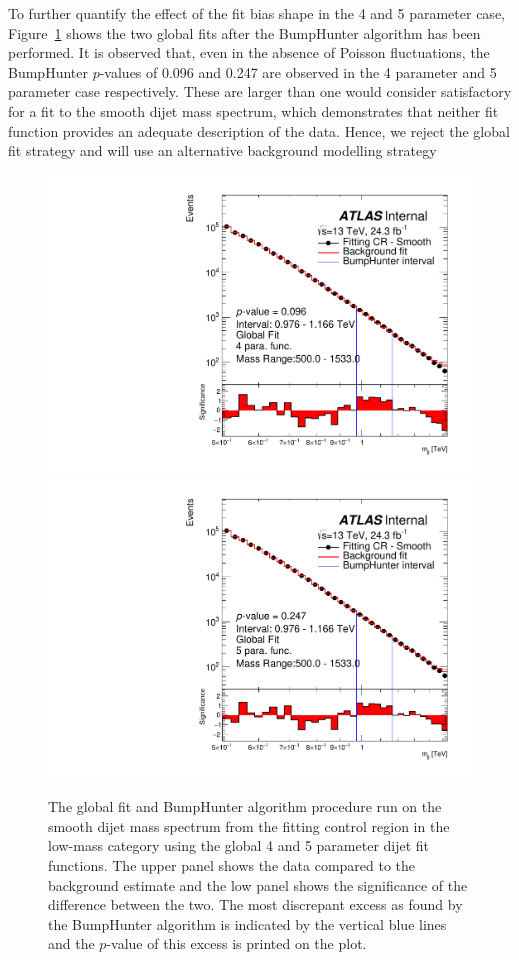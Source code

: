 To further quantify the effect of the fit bias shape in the 4 and 5 parameter case,
Figure~\ref{fig:bhFit_lm_global} shows the two global fits after the {\sc BumpHunter} algorithm has been performed.
It is observed that, even in the absence of Poisson fluctuations,
the {\sc BumpHunter} \mbox{$p$-value}s of 0.096 and 0.247 are observed in the 4 parameter and 5 parameter case respectively.
These are larger than one would consider satisfactory for a fit to the smooth dijet mass spectrum,
which demonstrates that neither fit function provides an adequate description of the data.
Hence, we reject the global fit strategy and will use an alternative background modelling strategy

\begin{figure}[!htb]
\captionsetup[subfigure]{aboveskip=0pt,justification=centering}
\centering
{} {
  \includegraphics[width=0.45\linewidth, angle=0]{figs/Dibjet/LowMass/FitStudy/globalFit_lm_bH_4para.pdf}
}
 {
  \includegraphics[width=0.45\linewidth, angle=0]{figs/Dibjet/LowMass/FitStudy/globalFit_lm_bH_5para.pdf}
}
\vspace{10pt}
\caption{\label{fig:bhFit_lm_global}
  The global fit and {\sc BumpHunter} algorithm procedure run on the smooth dijet mass spectrum from the fitting control region in the low-mass category
  using the global 4 and 5 parameter dijet fit functions.
  The upper panel shows the data compared to the background estimate and the low panel shows the significance of the difference between the two.
  The most discrepant excess as found by the {\sc BumpHunter} algorithm is indicated by the vertical blue lines and the \mbox{$p$-value} of this excess is printed on the plot. }
\end{figure}

